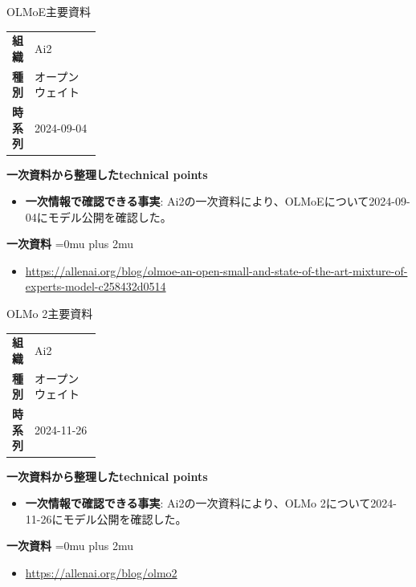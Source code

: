 \begin{technicalnote}{OLMoE}{主要資料}
\begingroup
\begin{tabularx}{\linewidth}{@{}>{\bfseries}p{0.22\linewidth}X@{}}
組織 & Ai2 \\
種別 & オープンウェイト \\
時系列 & 2024-09-04 \\
\end{tabularx}
\smallskip
{\bfseries 一次資料から整理したtechnical points}
\begin{itemize}[leftmargin=1.5em,itemsep=0.35em]
\item \textbf{一次情報で確認できる事実}: Ai2の一次資料により、OLMoEについて2024-09-04にモデル公開を確認した。
\end{itemize}
\begin{minipage}{\linewidth}
\begin{samepage}
{\bfseries 一次資料}
\begingroup\sloppy
\Urlmuskip=0mu plus 2mu\relax
\begin{itemize}[leftmargin=1.5em,itemsep=0.25em]
\item {\scriptsize\url{https://allenai.org/blog/olmoe-an-open-small-and-state-of-the-art-mixture-of-experts-model-c258432d0514}}
\end{itemize}
\endgroup
\end{samepage}
\end{minipage}
\endgroup
\end{technicalnote}
\medskip

\begin{technicalnote}{OLMo 2}{主要資料}
\begingroup
\begin{tabularx}{\linewidth}{@{}>{\bfseries}p{0.22\linewidth}X@{}}
組織 & Ai2 \\
種別 & オープンウェイト \\
時系列 & 2024-11-26 \\
\end{tabularx}
\smallskip
{\bfseries 一次資料から整理したtechnical points}
\begin{itemize}[leftmargin=1.5em,itemsep=0.35em]
\item \textbf{一次情報で確認できる事実}: Ai2の一次資料により、OLMo 2について2024-11-26にモデル公開を確認した。
\end{itemize}
\begin{minipage}{\linewidth}
\begin{samepage}
{\bfseries 一次資料}
\begingroup\sloppy
\Urlmuskip=0mu plus 2mu\relax
\begin{itemize}[leftmargin=1.5em,itemsep=0.25em]
\item {\scriptsize\url{https://allenai.org/blog/olmo2}}
\end{itemize}
\endgroup
\end{samepage}
\end{minipage}
\endgroup
\end{technicalnote}
\medskip

